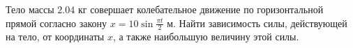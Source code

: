 Тело массы $2.04$ кг совершает колебательное движение
по горизонтальной прямой согласно закону
$x = 10\sin{\frac{\pi t}{2}}$ м.
Найти зависимость силы, действующей на тело, от координаты $x$,
а также наибольшую величину этой силы.
